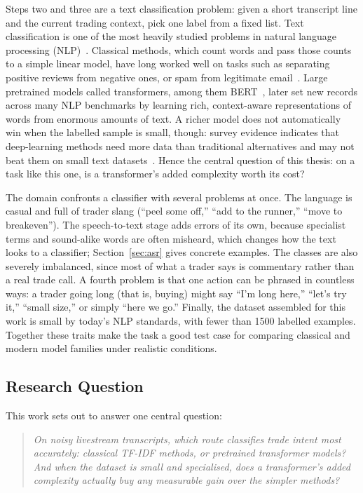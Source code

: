Steps two and three are a text classification problem: given a short transcript line and the current trading context, pick one label from a fixed list. Text classification is one of the most heavily studied problems in natural language processing (NLP)~\cite{kowsari2019text}. Classical methods, which count words and pass those counts to a simple linear model, have long worked well on tasks such as separating positive reviews from negative ones, or spam from legitimate email~\cite{joachims1998text, kowsari2019text}. Large pretrained models called transformers, among them BERT~\cite{devlin2019bert}, later set new records across many NLP benchmarks by learning rich, context-aware representations of words from enormous amounts of text. A richer model does not automatically win when the labelled sample is small, though: survey evidence indicates that deep-learning methods need more data than traditional alternatives and may not beat them on small text datasets~\cite{kowsari2019text}. Hence the central question of this thesis: on a task like this one, is a transformer's added complexity worth its cost?

The domain confronts a classifier with several problems at once. The language is casual and full of trader slang (``peel some off,'' ``add to the runner,'' ``move to breakeven''). The speech-to-text stage adds errors of its own, because specialist terms and sound-alike words are often misheard, which changes how the text looks to a classifier; Section~\ref{sec:asr} gives concrete examples. The classes are also severely imbalanced, since most of what a trader says is commentary rather than a real trade call. A fourth problem is that one action can be phrased in countless ways: a trader going long (that is, buying) might say ``I'm long here,'' ``let's try it,'' ``small size,'' or simply ``here we go.'' Finally, the dataset assembled for this work is small by today's NLP standards, with fewer than 1500 labelled examples. Together these traits make the task a good test case for comparing classical and modern model families under realistic conditions.

\subsection{Research Question}
\label{sec:research_question}

This work sets out to answer one central question:

\begin{quote}
\emph{On noisy livestream transcripts, which route classifies trade intent most accurately: classical TF-IDF methods, or pretrained transformer models? And when the dataset is small and specialised, does a transformer's added complexity actually buy any measurable gain over the simpler methods?}
\end{quote}

